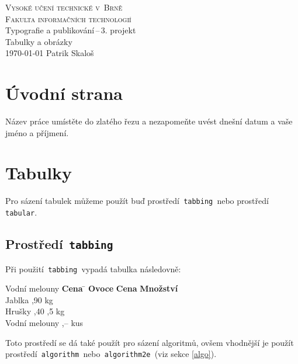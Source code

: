 \documentclass[a4paper, 11pt]{article}
\begin{document}
  \begin{titlepage}
    \begin{center}
      \Huge
      \textsc{Vysoké učení technické v~Brně} \\
      \huge\textsc{Fakulta informačních technologií} \\
      \LARGE
      Typografie a publikování\,--\,3. projekt\\
      \Huge
      Tabulky a obrázky\\
      {\Large \today\hfill
      Patrik Skaloš}
    \end{center}
  \end{titlepage}

  \section{Úvodní strana}
  Název práce umístěte do zlatého řezu a nezapomeňte uvést dnešní datum a vaše
  jméno a příjmení.

  \section{Tabulky}
  Pro sázení tabulek můžeme použít buď prostředí\texttt{ tabbing }nebo
  prostředí\texttt{ tabular}.

  \subsection{Prostředí\texttt{ tabbing }}
  Při použití\texttt{ tabbing }vypadá tabulka následovně:
  \begin{tabbing}
    Vodní melouny \quad \= \textbf{Cena} \quad \= \kill
    \textbf{Ovoce} \> \textbf{Cena} \> \textbf{Množství} \\
    Jablka ,90  kg \\
    Hrušky ,40 ,5 kg \\
    Vodní melouny ,--  kus \\
  \end{tabbing}
  Toto prostředí se dá také použít pro sázení algoritmů, ovšem vhodnější je
  použít prostředí\texttt{ algorithm }nebo\texttt{ algorithm2e }(viz sekce \ref{algo}).
\end{document}
